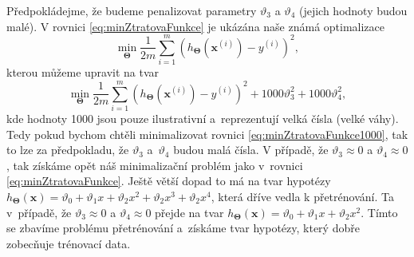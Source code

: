 \par{Předpokládejme, že budeme penalizovat parametry $\vartheta_3$ a $\vartheta_4$ (jejich hodnoty budou malé). V rovnici \ref{eq:minZtratovaFunkce} je ukázána naše známá optimalizace
\begin{equation}
	\min_{\bm{\Theta}} \frac{1}{2m} \sum_{i=1}^{m} \left( h_{\bm{\Theta}} \left( \bm{x}^{\left( i \right)} \right) - y^{\left( i \right)} \right)^2,
	\label{eq:minZtratovaFunkce}
\end{equation}
kterou můžeme upravit na tvar
\begin{equation}
	\min_{\bm{\Theta}} \frac{1}{2m} \sum_{i=1}^{m} \left( h_{\bm{\Theta}} \left( \bm{x}^{\left( i \right)} \right) - y^{\left( i \right)} \right)^2 + 1000 \vartheta_3^2 + 1000 \vartheta_4^2,
	\label{eq:minZtratovaFunkce1000}
\end{equation}
kde hodnoty 1000 jsou pouze ilustrativní a~reprezentují velká čísla (velké váhy). Tedy pokud bychom chtěli minimalizovat rovnici \ref{eq:minZtratovaFunkce1000}, tak to lze za předpokladu, že $\vartheta_3$ a~$\vartheta_4$ budou malá čísla. V případě, že $\vartheta_3 \approx 0$ a $\vartheta_4 \approx 0$, tak získáme opět náš minimalizační problém jako v~rovnici \ref{eq:minZtratovaFunkce}. Ještě větší dopad to má na tvar hypotézy $h_{\bm{\Theta}} \left( \bm{x} \right) = \vartheta_0 + \vartheta_1 x + \vartheta_2 x^2 + \vartheta_2 x^3 + \vartheta_2 x^4$, která dříve vedla k přetrénování. Ta v~případě, že  $\vartheta_3 \approx 0$ a $\vartheta_4 \approx 0$ přejde na tvar $h_{\bm{\Theta}} \left( \bm{x} \right) = \vartheta_0 + \vartheta_1 x + \vartheta_2 x^2$. Tímto se zbavíme problému přetrénování a~získáme tvar hypotézy, který dobře zobecňuje trénovací data.}

